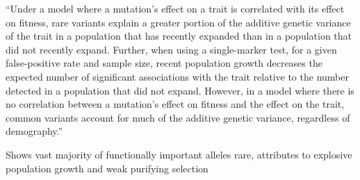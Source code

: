 \documentclass[11pt]{article}
\begin{document}
\citep{lohmueller2014impact} 
``Under a model where a mutation's effect on a trait is correlated with its effect on fitness, rare variants explain a greater portion of the additive genetic variance of the trait in a population that has recently expanded than in a population that did not recently expand. Further, when using a single-marker test, for a given false-positive rate and sample size, recent population growth decreases the expected number of significant associations with the trait relative to the number detected in a population that did not expand. However, in a model where there is no correlation between a mutation's effect on fitness and the effect on the trait, common variants account for much of the additive genetic variance, regardless of demography.''

\citep{tennessen2012evolution} Shows vast majority of functionally important alleles rare, attributes to explosive population growth and weak purifying selection

\citep{hufford2013genomic} \citep{hufford2012comparative}

%
%





\newpage

\end{document}
